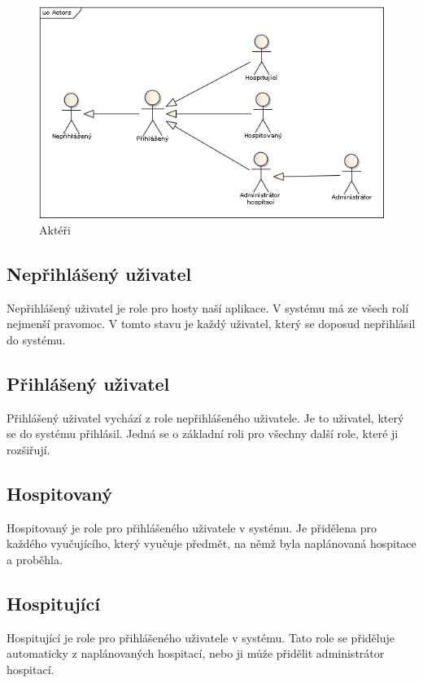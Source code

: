 \begin{figure}[h]
\begin{center}
\includegraphics[width=14cm]{figures/Actors}
\caption{Aktéři}
\label{fig:actors}
\end{center}
\end{figure}

\subsection{Nepřihlášený uživatel}
Nepřihlášený uživatel je role pro hosty naší aplikace. V systému má ze všech rolí nejmenší pravomoc. V tomto stavu je každý uživatel, který se doposud nepřihlásil do systému.

\subsection{Přihlášený uživatel}
Přihlášený uživatel vychází z role nepřihlášeného uživatele. Je to uživatel, který se do systému přihlásil. Jedná se o základní roli pro všechny další role, které ji rozšiřují.

\subsection{Hospitovaný}
Hospitovaný je role pro přihlášeného uživatele v systému. Je přidělena pro každého vyučujícího, který vyučuje předmět, na němž byla naplánovaná hospitace a proběhla.

\subsection{Hospitující}
Hospitující je role pro přihlášeného uživatele v systému. Tato role se přiděluje automaticky z naplánovaných hospitací, nebo ji může přidělit administrátor hospitací.

